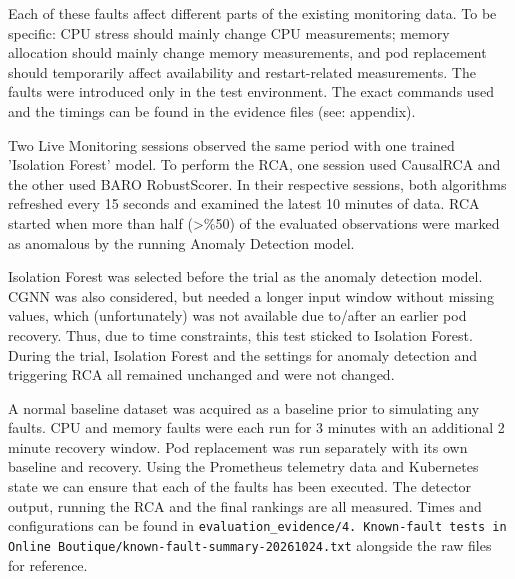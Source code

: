 Each of these faults affect different parts of the existing monitoring data. To be specific: CPU stress should mainly change CPU measurements; memory allocation should mainly change memory measurements, and pod replacement should temporarily affect availability and restart-related measurements. The faults were introduced only in the test environment. The exact commands used and the timings can be found in the evidence files (see: appendix).

Two Live Monitoring sessions observed the same period with one trained 'Isolation Forest' model. To perform the RCA, one session used CausalRCA and the other used BARO RobustScorer. In their respective sessions, both algorithms refreshed every 15 seconds and examined the latest 10 minutes of data. RCA started when more than half (>\%50) of the evaluated observations were marked as anomalous by the running Anomaly Detection model.

Isolation Forest was selected before the trial as the anomaly detection model. CGNN was also considered, but needed a longer input window without missing values, which (unfortunately) was not available due to/after an earlier pod recovery. Thus, due to time constraints, this test sticked to Isolation Forest. During the trial, Isolation Forest and the settings for anomaly detection and triggering RCA all remained  unchanged and were not changed.


A normal baseline dataset was acquired as a baseline prior to simulating any faults. CPU and memory faults were each run for 3 minutes with an additional 2 minute recovery window. Pod replacement was run separately with its own baseline and recovery. Using the Prometheus telemetry data and Kubernetes state we can ensure that each of the faults has been executed. The detector output, running the RCA and the final rankings are all measured. Times and configurations can be found in \texttt{evaluation\_evidence/4. Known-fault tests in Online Boutique/known-fault-summary-20261024.txt} alongside the raw files for reference.

